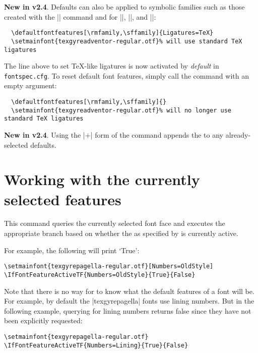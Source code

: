 
\textbf{New in v2.4}.
Defaults can also be applied to symbolic families such as those created with the |\newfontfamily| command and for |\rmfamily|, |\sffamily|, and |\ttfamily|:
\begin{Verbatim}
  \defaultfontfeatures[\rmfamily,\sffamily]{Ligatures=TeX}
  \setmainfont{texgyreadventor-regular.otf}% will use standard TeX ligatures
\end{Verbatim}
The line above to set \TeX-like ligatures is now activated by \emph{default} in \texttt{fontspec.cfg}.
To reset default font features, simply call the command with an empty argument:
\begin{Verbatim}
  \defaultfontfeatures[\rmfamily,\sffamily]{}
  \setmainfont{texgyreadventor-regular.otf}% will no longer use standard TeX ligatures
\end{Verbatim}


\textbf{New in v2.4}.
Using the |+| form of the command appends the  to any already-selected defaults.


\section{Working with the currently selected features}
\label{sec:addfontfeatures}



This command queries the currently selected font face and executes the appropriate branch based on whether the  as specified by  is currently active.

For example, the following will print `True':
\begin{Verbatim}
\setmainfont{texgyrepagella-regular.otf}[Numbers=OldStyle]
\IfFontFeatureActiveTF{Numbers=OldStyle}{True}{False}
\end{Verbatim}

Note that there is no way for  to know what the default features of a font will be. For example, by default the |texgyrepagella| fonts use lining numbers. But in the following example, querying for lining numbers returns false since they have not been explicitly requested:
\begin{Verbatim}
\setmainfont{texgyrepagella-regular.otf}
\IfFontFeatureActiveTF{Numbers=Lining}{True}{False}
\end{Verbatim}

